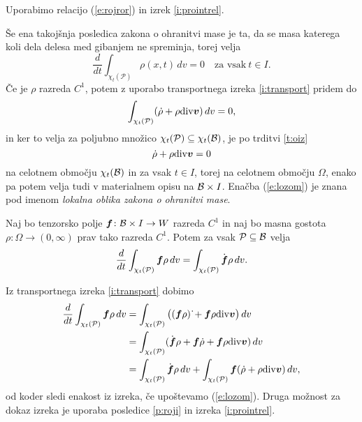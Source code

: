 \proof
	Uporabimo relacijo (\ref{e:rojror}) in izrek \ref{i:prointrel}.
\endproof

Še ena takojšnja posledica zakona o ohranitvi mase je ta, da se masa katerega koli
dela delesa med gibanjem ne spreminja, torej velja
\[ \frac{d}{dt}\int_{\chi_t(\mathcal{P})}\rho(x,t)\,dv = 0\quad\textrm{za vsak}\ t\in I. \]
Če je $\rho$ razreda $C^1$, potem z uporabo transportnega izreka \ref{i:transport}
pridem do
\[ \int_{\chi_t(\mathcal{P})}(\dot{\rho}+\rho\mathrm{div}\boldsymbol v)\,dv=0, \]
in ker to velja za poljubno množico $\chi_t(\mathcal{P})\subseteq\chi_t(\mathcal B)$, je po trditvi \ref{t:oiz}
\begin{equation} \label{e:lozom}
	\dot{\rho}+\rho\mathrm{div}\boldsymbol v=0
\end{equation}
na celotnem območju $\chi_t(\mathcal B)$ in za vsak $t\in I$, torej na celotnem območju $\Omega$,
enako pa potem velja tudi v materialnem opisu na $\mathcal B\times I$.
Enačba (\ref{e:lozom}) je znana pod imenom \emph{lokalna oblika zakona o ohranitvi mase}.

\begin{izrek}
	Naj bo tenzorsko polje $\boldsymbol f\colon \mathcal B\times I\to W$ razreda $C^1$ in naj bo masna gostota
	$\rho\colon\Omega\to(0,\infty)$ prav tako razreda $C^1$.
	Potem za vsak $\mathcal{P}\subseteq\mathcal B$ velja
	\[
		\frac{d}{dt}\int_{\chi_t(\mathcal{P})}\boldsymbol f\rho\,dv=
		\int_{\chi_t(\mathcal{P})}\dot{\boldsymbol f}\rho\,dv.
	\]
\end{izrek}
\proof
	Iz transportnega izreka \ref{i:transport} dobimo
	\begin{align*}
		\frac{d}{dt}\int_{\chi_t(\mathcal{P})}\boldsymbol f\rho\,dv
		&= \int_{\chi_t(\mathcal{P})}\big((\boldsymbol f\rho)\,\dot{}+\boldsymbol f\rho\mathrm{div}\boldsymbol v\big)\,dv \\
		&= \int_{\chi_t(\mathcal{P})}(\dot{\boldsymbol f}\rho+\boldsymbol f\dot{\rho}+\boldsymbol f\rho\mathrm{div}\boldsymbol v)\,dv\\
		&= \int_{\chi_t(\mathcal{P})}\dot{\boldsymbol f}\rho\,dv+
		\int_{\chi_t(\mathcal{P})}\boldsymbol f(\dot{\rho}+\rho\mathrm{div}\boldsymbol v)\,dv,
	\end{align*}
	od koder sledi enakost iz izreka, če upoštevamo (\ref{e:lozom}).
\endproof
Druga možnost za dokaz izreka je uporaba posledice \ref{p:roji} in
izreka \ref{i:prointrel}.